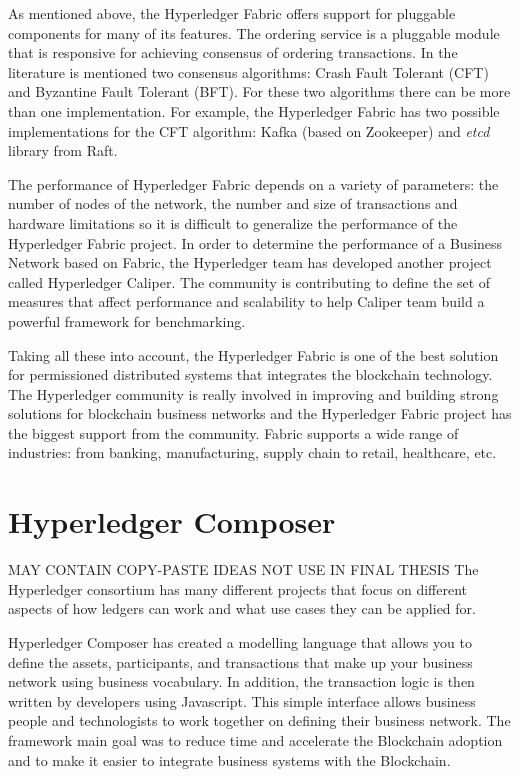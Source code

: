 As mentioned above, the Hyperledger Fabric offers support for pluggable components for many of its features. The ordering service is a pluggable module that is responsive for achieving consensus of ordering transactions. In the literature is mentioned two consensus algorithms: Crash Fault Tolerant (CFT) and Byzantine Fault Tolerant (BFT). For these two algorithms there can be more than one implementation.
For example, the Hyperledger Fabric has two possible implementations for the CFT algorithm: Kafka (based on Zookeeper) and \emph{etcd} library from Raft.

The performance of Hyperledger Fabric depends on a variety of parameters: the number of nodes of the network, the number and size of transactions and hardware limitations so it is difficult to generalize the performance of the Hyperledger Fabric project. 
In order to determine the performance of a Business Network based on Fabric, the Hyperledger team has developed another project called Hyperledger Caliper. The community is contributing to define the set of measures that affect performance and scalability to help Caliper team build a powerful framework for benchmarking. 

Taking all these into account, the Hyperledger Fabric is one of the best solution for permissioned distributed systems that integrates the blockchain technology.
The Hyperledger community is really involved in improving and building strong solutions for blockchain business networks and the Hyperledger Fabric project has the biggest support from the community. Fabric supports a wide range of industries: from banking, manufacturing, supply chain to retail, healthcare, etc.


\section{Hyperledger Composer}
\label{sub-sec:chapter1-section3}

\iffalse
MAY CONTAIN COPY-PASTE IDEAS
NOT USE IN FINAL THESIS
The Hyperledger consortium has many different projects that focus on different aspects of how ledgers can work and what use cases they can be applied for.

Hyperledger Composer has created a modelling language that allows you to define the assets, participants, and transactions that make up your business network using business vocabulary. In addition, the transaction logic is then written by developers using Javascript. This simple interface allows business people and technologists to work together on defining their business network.
The framework main goal was to reduce time and accelerate the Blockchain adoption and to make it easier to integrate business systems with the Blockchain.

